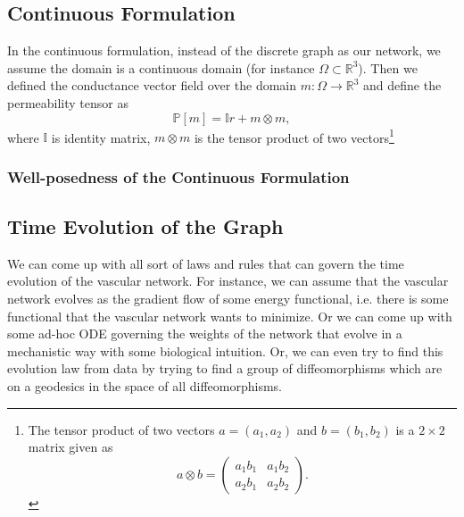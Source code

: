 \documentclass[10pt,a4paper,twocolumn]{article}
\newcommand{\R}{\mathbb{R}}
\begin{document}
	\subsection{Continuous Formulation}
	In the continuous formulation, instead of the discrete graph as our network, we assume the domain is a continuous domain (for instance $ \Omega \subset \R^3 $). Then we defined the conductance vector field over the domain $ m: \Omega \to \R^3 $ and define the permeability tensor as
	\[ \mathbb{P}[m] = \mathbb{I}r + m\otimes m, \]
	where $ \mathbb{I} $ is identity matrix, $ m\otimes m $ is the tensor product of two vectors\footnote{The tensor product of two vectors $ a=(a_1,a_2) $ and $ b = (b_1,b_2) $ is a $ 2\times 2 $ matrix given as 
	\[ a\otimes b = 
	\begin{pmatrix}
		a_1 b_1 & a_1 b_2 \\
		a_2 b_1 & a_2 b_2
	\end{pmatrix}.
	 \]
	}
	
	\subsubsection{Well-posedness of the Continuous Formulation}
	
	
	\subsection{Time Evolution of the Graph}
	We can come up with all sort of laws and rules that can govern the time evolution of the vascular network. For instance, we can assume that the vascular network evolves as the gradient flow of some energy functional, i.e. there is some functional that the vascular network wants to minimize. Or we can come up with some ad-hoc ODE governing the weights of the network that evolve in a mechanistic way with some biological intuition. Or, we can even try to find this evolution law from data by trying to find a group of diffeomorphisms which are on a geodesics in the space of all diffeomorphisms. 
	
\end{document}
